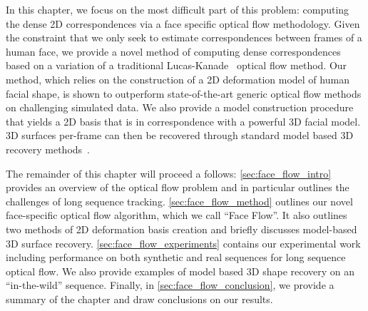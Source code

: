 In this chapter, we focus on the most difficult part of this 
problem: computing the dense 2D correspondences via a face specific
optical flow methodology. Given the constraint
that we only seek to estimate correspondences between frames of a human face,
we provide a novel method of computing dense correspondences based on a variation
of a traditional Lucas-Kanade~\cite{lucas1981iterative} optical flow method.
Our method, which relies on the construction of a 2D deformation model of
human facial shape, is shown to outperform state-of-the-art generic optical flow
methods on challenging simulated data. We also provide a model construction
procedure that yields a 2D basis that is in correspondence with a powerful
3D facial model. 3D surfaces per-frame can then be recovered through standard
model based 3D recovery methods~\cite{aldrian2010linear,aldrian2013inverse,bas2016fitting}.


The remainder of this chapter will proceed a follows: \cref{sec:face_flow_intro}
provides an overview of the optical flow problem and in particular
outlines the challenges of long sequence tracking. \cref{sec:face_flow_method}
outlines our novel face-specific optical flow algorithm, which we call
``Face Flow''. It also outlines two methods of 2D deformation basis
creation and briefly discusses model-based 3D surface recovery.
\cref{sec:face_flow_experiments} contains our experimental work
including performance on both synthetic and real sequences for long
sequence optical flow. We also provide examples of model based 3D shape recovery
on an ``in-the-wild'' sequence. Finally, in \cref{sec:face_flow_conclusion},
we provide a summary of the chapter and draw conclusions on our results.
{






}
\stopcontents[chapters]
